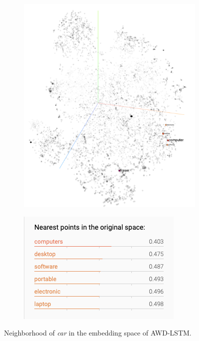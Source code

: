 \begin{figure}
\centering
\begin{subfigure}{.5\textwidth}
  \centering
  \includegraphics[width=\linewidth]{figures/computer_emb_neighbors.png}
  \label{figure:car:neighborhood}
\end{subfigure}%
\begin{subfigure}{.5\textwidth}
  \centering
  \includegraphics[width=\linewidth]{figures/computer_nearest_neighbors.png}
  \label{figure:car:neighbor}
\end{subfigure}
\caption{Neighborhood of \emph{car} in the embedding space of AWD-LSTM.}
\label{figure:car}
\end{figure}

